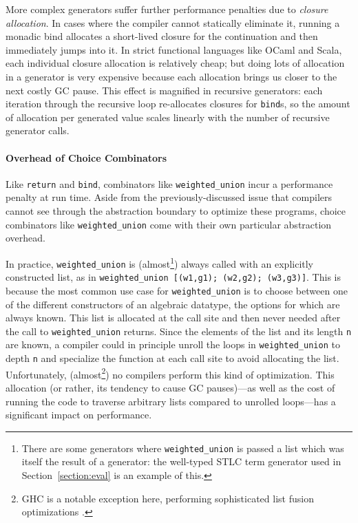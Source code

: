 \documentclass[acmsmall]{acmart}
\theoremstyle{definition}
\begin{document}
More complex
generators suffer further performance penalties due to \emph{closure
allocation}. In cases where the compiler cannot statically eliminate it,
running a monadic bind allocates a short-lived closure
for the continuation and then immediately jumps into it.
In strict functional languages like OCaml and Scala,
each individual closure allocation is relatively cheap; but doing lots of allocation in a
generator is very expensive because each allocation brings us closer to the next costly GC pause.
This effect is magnified in recursive generators: each iteration
through the recursive loop re-allocates closures for \texttt{bind}s, so the amount of allocation
per generated value scales linearly with the number of recursive generator calls.

\paragraph{Overhead of Choice Combinators}
Like \texttt{return} and \texttt{bind}, combinators like \texttt{weighted\_union} incur a performance penalty
at run time. Aside from the previously-discussed issue that compilers
cannot see through the abstraction boundary to optimize these programs,
choice combinators like \texttt{weighted\_union} come with their own particular abstraction overhead.

In practice, \texttt{weighted\_union} is (almost\footnote{
There are some generators where \texttt{weighted\_union} is passed a list which
was itself the result of a generator: the well-typed STLC term generator used in Section~\ref{section:eval} is an example of this.
}) always called with an explicitly constructed list, as in
\texttt{weighted\_union [(w1,g1); (w2,g2); (w3,g3)]}.
This is because the most common use case for \texttt{weighted\_union} is
to choose between one of the different constructors of an algebraic datatype,
the options for which are always known.
This list is allocated at the call site and then never needed after the call to \texttt{weighted\_union} returns.
Since the elements of the list and its length \texttt{n} are known,
a compiler could in principle unroll the loops in \texttt{weighted\_union} to depth \texttt{n} and specialize the function at each call site to avoid allocating the list.
Unfortunately, (almost\footnote{GHC is a notable exception here, performing sophisticated list fusion optimizations \cite{gill93}.}) no compilers perform this kind of optimization.
This allocation (or rather, its tendency to cause GC pauses)---as well as the cost of running the code
to traverse arbitrary lists compared to unrolled loops---has a significant impact on
performance.
\end{document}
